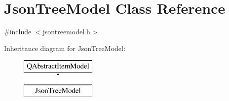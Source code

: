 \hypertarget{class_json_tree_model}{}\section{Json\+Tree\+Model Class Reference}
\label{class_json_tree_model}


{\ttfamily \#include $<$jsontreemodel.\+h$>$}

Inheritance diagram for Json\+Tree\+Model\+:\begin{figure}[H]
\begin{center}
\leavevmode
\includegraphics[height=2.000000cm]{class_json_tree_model}
\end{center}
\end{figure}
